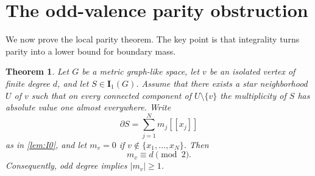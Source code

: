 \documentclass[11pt]{article}
\newtheorem{theorem}{Theorem}[section]
\theoremstyle{remark}
\newcommand{\I}{\mathbf I}
\newcommand{\llbracket}{[\![}
\newcommand{\rrbracket}{]\!]}
\begin{document}
\section{The odd-valence parity obstruction}\label{sec:parity}

We now prove the local parity theorem. The key point is that integrality turns parity into a lower bound for boundary mass.

\begin{theorem}\label{thm:local-parity}
Let $G$ be a metric graph-like space, let $v$ be an isolated vertex of finite degree $d$, and let $S\in\I_1(G)$. Assume that there exists a star neighborhood $U$ of $v$ such that on every connected component of $U\setminus\{v\}$ the multiplicity of $S$ has absolute value one almost everywhere. Write
\[
   \partial S=\sum_{j=1}^{N}m_j\llbracket x_j\rrbracket
\]
as in \cref{lem:I0}, and let $m_v=0$ if $v\notin\{x_1,\dots,x_N\}$. Then
\[
      m_v\equiv d\pmod 2.
\]
Consequently, odd degree implies $|m_v|\ge1$.
\end{theorem}
\end{document}
